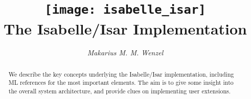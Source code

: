 \documentclass[12pt,a4paper,fleqn]{report}
\title{\texttt{[image: isabelle\_isar]}
  \\[4ex] The Isabelle/Isar Implementation}
\author{\emph{Makarius M. M. Wenzel}}
\begin{document}
\maketitle 

\begin{abstract}
  We describe the key concepts underlying the Isabelle/Isar
  implementation, including ML references for the most important
  elements.  The aim is to give some insight into the overall system
  architecture, and provide clues on implementing user extensions.
\end{abstract}

 \tableofcontents \clearfirst









%

\appendix


\begingroup
\tocentry{\bibname}
 \small\raggedright\frenchspacing

\endgroup

\tocentry{\glossaryname}
\printglossary

\tocentry{\indexname}
\printindex
\end{document}
